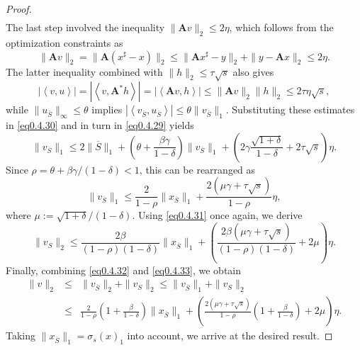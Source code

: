 \begin{proof}
\begin{eqnarray}
    \end{eqnarray}
    The last step involved the inequality $\|\mathbf{A}v\|_2 \leq 2\eta$, which follows from the optimization constraints as 
    \[
        \|\mathbf{A}v\|_2 = \|\mathbf{A}(x^{\sharp} -x)\|_2 \leq \|\mathbf{A}x^{\sharp} -y\|_2 + \|y-\mathbf{A}x\|_2 \leq 2\eta.
    \]
    The latter inequality combined with $\|h\|_2 \leq \tau\sqrt{s}$ also gives
    \[
        \left|\left<v,u\right>\right| = \left|\left<v, \mathbf{A}^*h\right>\right| = \left|\left<\mathbf{A}v, h\right>\right| \leq \|\mathbf{A}v\|_2 \|h\|_2 \leq 2\tau\eta\sqrt{s},
    \]
    while $\|u_{\overline{S}}\|_{\infty} \leq \theta$ implies $\left|\left<v_{\overline{S}}, u_{\overline{S}}\right>\right| \leq \theta \|v_{\overline{S}}\|_1$. Substituting these estimates in \cref{eq0.4.30} and in turn in \cref{eq0.4.29} yields
    \[
        \|v_{\overline{S}}\|_1 \leq 2\|\overline{S}\|_1 + \left( \theta+\frac{\beta\gamma}{1-\delta} \right)\|v_{\overline{S}}\|_1 + \left( 2\gamma\frac{\sqrt{1+\delta}}{1-\delta}+2\tau\sqrt{s} \right)\eta.
    \]
    Since $\rho = \theta + \beta\gamma/(1-\delta) < 1$, this can be rearranged as 
    \begin{equation}
        \|v_{\overline{S}}\|_1 \leq \frac{2}{1-\rho}\|x_{\overline{S}}\|_1 + \frac{2(\mu\gamma+\tau\sqrt{s})}{1-\rho}\eta,
        \label{eq0.4.32}
    \end{equation}
    where $\mu := \sqrt{1+\delta}/(1-\delta)$. Using \cref{eq0.4.31} once again, we derive
    \begin{equation}
        \|v_S\|_2 \leq \frac{2\beta}{(1-\rho)(1-\delta)} \|x_{\overline{S}}\|_1 + \left( \frac{2\beta(\mu\gamma+\tau\sqrt{s})}{(1-\rho)(1-\delta)}+2\mu \right)\eta.
        \label{eq0.4.33}
    \end{equation}
    Finally, combining \cref{eq0.4.32} and \cref{eq0.4.33}, we obtain
    \begin{eqnarray*}
        \|v\|_2 &\leq& \|v_{\overline{S}}\|_2 + \|v_S\|_2 \leq \|v_{\overline{S}}\|_1 + \|v_S\|_2 \\
        &\leq&\frac{2}{1-\rho}\left( 1+\frac{\beta}{1-\delta} \right) \|x_{\overline{S}}\|_1 + \left( \frac{2(\mu\gamma+\tau\sqrt{s})}{1-\rho} \left( 1+\frac{\beta}{1-\delta} \right) + 2\mu \right)\eta.
    \end{eqnarray*}
    Taking $\|x_{\overline{S}}\|_1 = \sigma_s(x)_1$ into account, we arrive at the desired result.
\end{proof}

